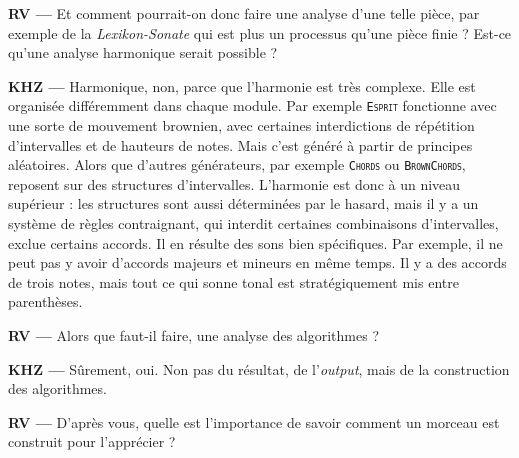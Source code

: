 \documentclass[a4paper,12pt]{article}
\newcommand{\module}[1]{\texttt{\textsc{#1}}}
\begin{document}
\textbf{RV ---} Et comment pourrait-on donc faire une analyse d'une telle pièce, par exemple de la \emph{Lexikon-Sonate} qui est plus un processus qu'une pièce finie ? Est-ce qu'une analyse harmonique serait possible ?

\textbf{KHZ ---} Harmonique, non, parce que l'harmonie est très complexe. Elle est organisée différemment dans chaque module. Par exemple \module{Esprit} fonctionne avec une sorte de mouvement brownien, avec certaines interdictions de répétition d'intervalles et de hauteurs de notes. Mais c'est généré à partir de principes aléatoires. Alors que d'autres générateurs, par exemple \module{Chords} ou \module{BrownChords}, reposent sur des structures d'intervalles. L'harmonie est donc à un niveau supérieur : les structures sont aussi déterminées par le hasard, mais il y a un système de règles contraignant, qui interdit certaines combinaisons d'intervalles, exclue certains accords. Il en résulte des sons bien spécifiques. Par exemple, il ne peut pas y avoir d'accords majeurs et mineurs en même temps. Il y a des accords de trois notes, mais tout ce qui sonne tonal est stratégiquement mis entre parenthèses.

\textbf{RV ---} Alors que faut-il faire, une analyse des algorithmes ?

\textbf{KHZ ---} Sûrement, oui. Non pas du résultat, de l'\emph{output}, mais de la construction des algorithmes.

\textbf{RV ---} D'après vous, quelle est l'importance de savoir comment un morceau est construit pour l'apprécier ?
\end{document}
